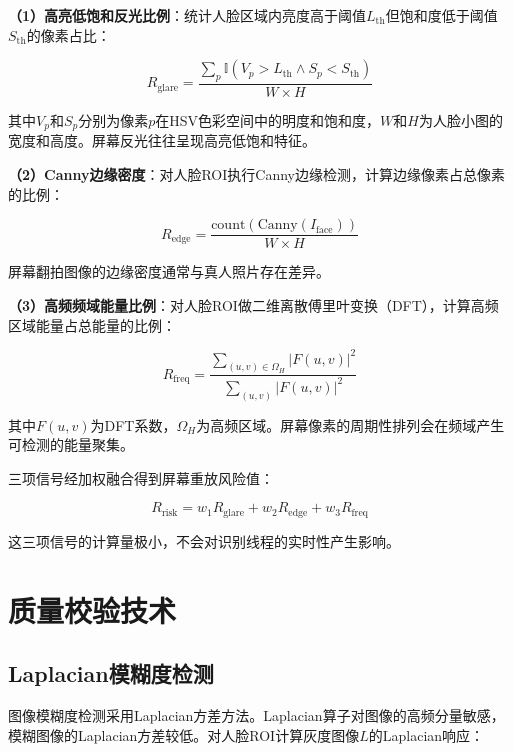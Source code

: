 \textbf{（1）高亮低饱和反光比例}：统计人脸区域内亮度高于阈值$L_{\text{th}}$但饱和度低于阈值$S_{\text{th}}$的像素占比：

\begin{equation}
    R_{\text{glare}} = \frac{\sum_{p} \mathbb{I}(V_p > L_{\text{th}} \land S_p < S_{\text{th}})}{W \times H}
\end{equation}

其中$V_p$和$S_p$分别为像素$p$在HSV色彩空间中的明度和饱和度，$W$和$H$为人脸小图的宽度和高度。屏幕反光往往呈现高亮低饱和特征。

\textbf{（2）Canny边缘密度}：对人脸ROI执行Canny边缘检测，计算边缘像素占总像素的比例：

\begin{equation}
    R_{\text{edge}} = \frac{\text{count}(\text{Canny}(I_{\text{face}}))}{W \times H}
\end{equation}

屏幕翻拍图像的边缘密度通常与真人照片存在差异。

\textbf{（3）高频频域能量比例}：对人脸ROI做二维离散傅里叶变换（DFT），计算高频区域能量占总能量的比例：

\begin{equation}
    R_{\text{freq}} = \frac{\sum_{(u,v) \in \Omega_H} |F(u,v)|^2}{\sum_{(u,v)} |F(u,v)|^2}
\end{equation}

其中$F(u,v)$为DFT系数，$\Omega_H$为高频区域。屏幕像素的周期性排列会在频域产生可检测的能量聚集。

三项信号经加权融合得到屏幕重放风险值：

\begin{equation}
    R_{\text{risk}} = w_1 R_{\text{glare}} + w_2 R_{\text{edge}} + w_3 R_{\text{freq}}
\end{equation}

这三项信号的计算量极小，不会对识别线程的实时性产生影响。

\section{质量校验技术}

\subsection{Laplacian模糊度检测}

图像模糊度检测采用Laplacian方差方法。Laplacian算子对图像的高频分量敏感，模糊图像的Laplacian方差较低。对人脸ROI计算灰度图像$L$的Laplacian响应：

